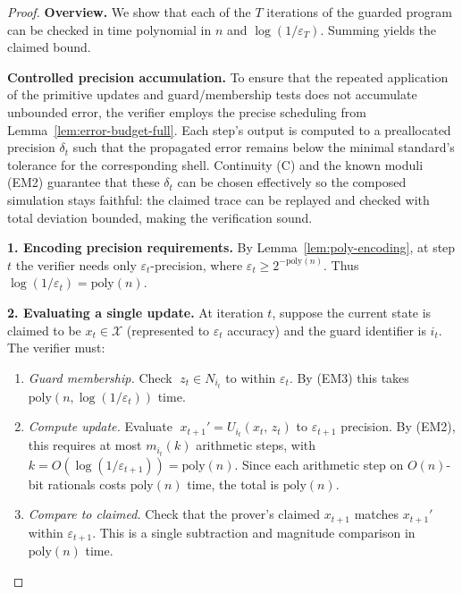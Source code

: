 \documentclass[12pt]{article}
\theoremstyle{definition}
\theoremstyle{plain}
\begin{document}
\begin{proof}
\textbf{Overview.}  We show that each of the \(T\) iterations of the guarded program can be checked in time polynomial in \(n\) and \(\log(1/\varepsilon_T)\).  Summing yields the claimed bound.

\medskip\noindent\textbf{Controlled precision accumulation.}  
To ensure that the repeated application of the primitive updates and guard/membership tests does not accumulate unbounded error, the verifier employs the precise scheduling from Lemma~\ref{lem:error-budget-full}. Each step’s output is computed to a preallocated precision \(\delta_t\) such that the propagated error remains below the minimal standard’s tolerance for the corresponding shell. Continuity (C) and the known moduli (EM2) guarantee that these \(\delta_t\) can be chosen effectively so the composed simulation stays faithful: the claimed trace can be replayed and checked with total deviation bounded, making the verification sound.


\medskip
\noindent\textbf{1. Encoding precision requirements.}
By Lemma~\ref{lem:poly-encoding}, at step \(t\) the verifier needs only \(\varepsilon_t\)-precision, where \(\varepsilon_t\ge 2^{-\mathrm{poly}(n)}\).  Thus \(\log(1/\varepsilon_t)=\mathrm{poly}(n)\).

\medskip
\noindent\textbf{2. Evaluating a single update.}
At iteration \(t\), suppose the current state is claimed to be \(x_t\in\mathcal X\) (represented to \(\varepsilon_t\) accuracy) and the guard identifier is \(i_t\).  The verifier must:

\begin{enumerate}[label=(\alph*), leftmargin=2em]
  \item \emph{Guard membership.}  Check \(\;z_t\in N_{i_t}\) to within \(\varepsilon_t\).  By (EM3) this takes \(\mathrm{poly}(n,\log(1/\varepsilon_t))\) time.

  \item \emph{Compute update.}  Evaluate 
  \(\;x_{t+1}' = U_{i_t}(x_t,\,z_t)\)
  to \(\varepsilon_{t+1}\) precision.  By (EM2), this requires at most \(m_{i_t}(k)\) arithmetic steps, with \(k = O(\log(1/\varepsilon_{t+1})) = \mathrm{poly}(n)\).  Since each arithmetic step on \(O(n)\)-bit rationals costs \(\mathrm{poly}(n)\) time, the total is \(\mathrm{poly}(n)\).

  \item \emph{Compare to claimed.}  Check that the prover’s claimed \(x_{t+1}\) matches \(x_{t+1}'\) within \(\varepsilon_{t+1}\).  This is a single subtraction and magnitude comparison in \(\mathrm{poly}(n)\) time.
\end{enumerate}


\end{proof}
\end{document}
